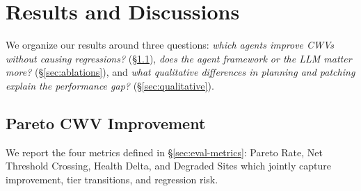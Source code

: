 \section{Results and Discussions}
\label{sec:results}

We organize our results around three questions: \emph{which agents improve CWVs without causing regressions?} (\S\ref{sec:pareto-results}), \emph{does the agent framework or the LLM matter more?} (\S\ref{sec:ablations}), and \emph{what qualitative differences in planning and patching explain the performance gap?} (\S\ref{sec:qualitative}).

\subsection{Pareto CWV Improvement}
\label{sec:pareto-results}

We report the four metrics defined in \S\ref{sec:eval-metrics}: Pareto Rate, Net Threshold Crossing, Health Delta, and Degraded Sites which jointly capture improvement, tier transitions, and regression risk.

